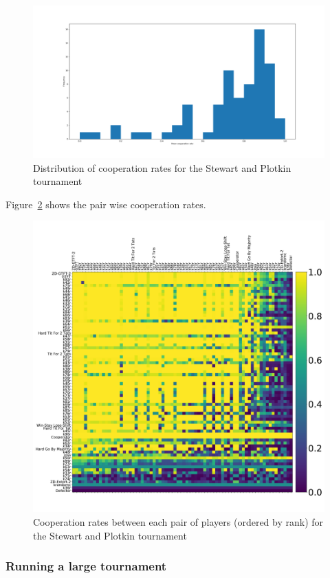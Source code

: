 \documentclass{article}
\begin{document}
\begin{figure}[!hbtp]
    \centering
    \includegraphics[width=.8\textwidth]{assets/sp_tournament_cooperation_rates.pdf}
    \caption{Distribution of cooperation rates for the Stewart and Plotkin
    tournament}
    \label{fig:sp_tournament_cooperation_rates}
\end{figure}

Figure~\ref{fig:sp_tournament_pairwise_cooperation_rates} shows the pair wise
cooperation rates.

\begin{figure}[!hbtp]
    \centering
    \includegraphics[width=.8\textwidth]{assets/sp_tournament_pairwise_cooperation_rates}
    \caption{Cooperation rates between each pair of players (ordered by rank)
    for the Stewart and Plotkin tournament}
    \label{fig:sp_tournament_pairwise_cooperation_rates}
\end{figure}

\subsubsection{Running a large tournament}\label{sec:run_with_everyone}
\end{document}
